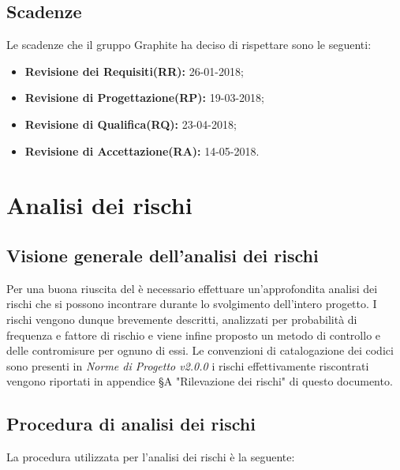\documentclass[../PianodiProgetto.tex]{subfiles}
\begin{document}
	\section{Scadenze}
	Le scadenze che il gruppo Graphite ha deciso di rispettare sono le seguenti:
	\begin{itemize}
		\item \textbf{Revisione dei Requisiti(RR):} 26-01-2018;
		\item \textbf{Revisione di Progettazione(RP):} 19-03-2018;
		\item \textbf{Revisione di Qualifica(RQ):} 23-04-2018;
		\item \textbf{Revisione di Accettazione(RA):} 14-05-2018.
	\end{itemize}
	
	\chapter{Analisi dei rischi}
	
	\section{Visione generale dell'analisi dei rischi}
	
	Per una buona riuscita del  è necessario effettuare un'approfondita analisi dei rischi che si possono incontrare durante lo svolgimento dell'intero progetto. I rischi vengono dunque brevemente descritti, analizzati per probabilità di frequenza e fattore di rischio e viene infine proposto un metodo di controllo e delle contromisure per ognuno di essi. Le convenzioni di catalogazione dei codici sono presenti in \textit{Norme di Progetto v2.0.0} i rischi effettivamente riscontrati vengono riportati in appendice §A "Rilevazione dei rischi" di questo documento.
	
	\section{Procedura di analisi dei rischi}
	
	La procedura utilizzata per l'analisi dei rischi è la seguente:
	
\end{document}

